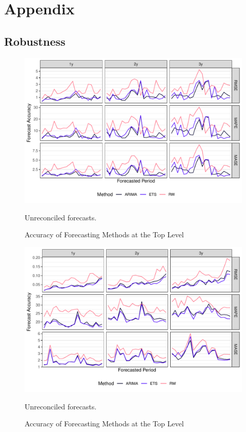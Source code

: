 
\appendix
\section{Appendix}

\subsection{Robustness}

\begin{figure}[H]
	\includegraphics[width=\textwidth]{fig/fig_eval_methods_top}
	\caption{Accuracy of Forecasting Methods at the Top Level}
	\footnotesize{Unreconciled forecasts.}
\end{figure}

\begin{figure}[H]
	\includegraphics[width=\textwidth]{fig/fig_eval_methods_bottom}
	\caption{Accuracy of Forecasting Methods at the Top Level}
	\footnotesize{Unreconciled forecasts.}
\end{figure}

